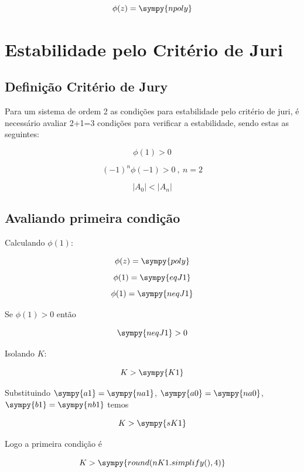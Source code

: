 \documentclass[a4paper,11pt]{article}
\newcommand{\npy}[1]{\sympy{round(#1,4)}}
\begin{document}
\begin{equation}\label{eq:poly-sys}
    \phi(z) = \sympy{npoly}
\end{equation}

\section{Estabilidade pelo Critério de Juri}

\subsection{Definição Critério de Jury}

Para um sistema de ordem 2 as condições para estabilidade pelo critério de juri, é necessário avaliar 2+1=3 condições para verificar a estabilidade, sendo estas as seguintes:

\begin{equation}\label{eq:jury-c1}
    \phi(1) > 0
\end{equation}

\begin{equation}\label{eq:jury-c2}
    (-1)^n\phi(-1) > 0\ ,\ n=2
\end{equation}

\begin{equation}\label{eq:jury-c3}
    |A_0| < |A_n|
\end{equation}

\subsection{Avaliando primeira condição}

Calculando $\phi(1)$:

$$\phi(z) = \sympy{poly}$$
$$\phi(1) = \sympy{eqJ1}$$
$$\phi(1) = \sympy{neqJ1}$$

Se $\phi(1) > 0$ então

$$\sympy{neqJ1} > 0$$

Isolando $K$:

\begin{equation}\label{eq:k-jury-c1}
    K > \sympy{K1}
\end{equation}

Substituindo $\sympy{a1} = \sympy{na1}$, $\sympy{a0} = \sympy{na0}$, $\sympy{b1} = \sympy{nb1}$ temos

$$K > \sympy{sK1}$$

Logo a primeira condição é

\begin{equation}\label{eq:k-jury-c1-numeric}
    K > \npy{nK1.simplify()}
\end{equation}
\end{document}
